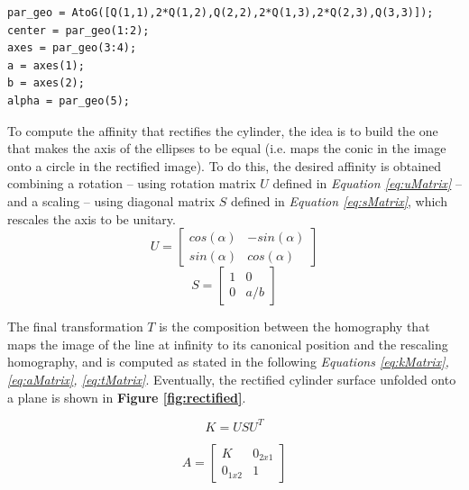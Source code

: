 \documentclass[12pt,a4paper]{article}
\begin{document}
\begin{verbatim}
par_geo = AtoG([Q(1,1),2*Q(1,2),Q(2,2),2*Q(1,3),2*Q(2,3),Q(3,3)]);
center = par_geo(1:2);
axes = par_geo(3:4);
a = axes(1);
b = axes(2);
alpha = par_geo(5);
\end{verbatim}
\bigskip

To compute the affinity that rectifies the cylinder, the idea is to build the one that makes the axis of the ellipses to be equal (i.e. maps the conic in the image onto a circle in the rectified image). To do this, the desired affinity is obtained combining a rotation -- using rotation matrix $U$ defined in \textit{Equation \ref{eq:uMatrix}} -- and a scaling -- using diagonal matrix $S$ defined in \textit{Equation \ref{eq:sMatrix}}, which rescales the axis to be unitary.\\

\begin{equation}
    U = 
    \begin{bmatrix}
    cos(\alpha) & -sin(\alpha)\\
    sin(\alpha) & cos(\alpha)
    \end{bmatrix}
    \label{eq:uMatrix}
\end{equation}
\bigskip
\begin{equation}
    S = 
    \begin{bmatrix}
    1 & 0\\
    0 & a/b
    \end{bmatrix}
    \label{eq:sMatrix}
\end{equation}
\bigskip

The final transformation $T$ is the composition between the homography that maps the image of the line at infinity to its canonical position and the rescaling homography, and is computed as stated in the following \textit{Equations \ref{eq:kMatrix}, \ref{eq:aMatrix}, \ref{eq:tMatrix}}. Eventually, the rectified cylinder surface unfolded onto a plane is shown in \textbf{Figure \ref{fig:rectified}}.

\begin{equation}
    K = USU^T
    \label{eq:kMatrix}
\end{equation}

\begin{equation}
    A = 
    \begin{bmatrix}
    K & 0_{2x1}\\
    0_{1x2} & 1
    \end{bmatrix}
    \label{eq:aMatrix}
\end{equation}
\end{document}
